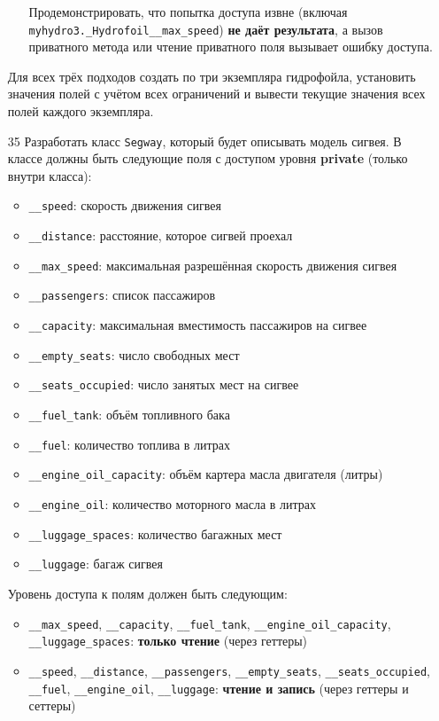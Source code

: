 \begin{enumerate}
\begin{enumerate}
    Продемонстрировать, что попытка доступа извне (включая \texttt{myhydro3.\_Hydrofoil\_\_max\_speed}) \textbf{не даёт результата}, а вызов приватного метода или чтение приватного поля вызывает ошибку доступа.
\end{enumerate}
Для всех трёх подходов создать по три экземпляра гидрофойла, установить значения полей с учётом всех ограничений и вывести текущие значения всех полей каждого экземпляра.
\item[35] Разработать класс \texttt{Segway}, который будет описывать модель сигвея. В классе должны быть следующие поля с доступом уровня \textbf{private} (только внутри класса):
\begin{itemize}
    \item \texttt{\_\_speed}: скорость движения сигвея  
    \item \texttt{\_\_distance}: расстояние, которое сигвей проехал  
    \item \texttt{\_\_max\_speed}: максимальная разрешённая скорость движения сигвея  
    \item \texttt{\_\_passengers}: список пассажиров  
    \item \texttt{\_\_capacity}: максимальная вместимость пассажиров на сигвее  
    \item \texttt{\_\_empty\_seats}: число свободных мест  
    \item \texttt{\_\_seats\_occupied}: число занятых мест на сигвее  
    \item \texttt{\_\_fuel\_tank}: объём топливного бака  
    \item \texttt{\_\_fuel}: количество топлива в литрах  
    \item \texttt{\_\_engine\_oil\_capacity}: объём картера масла двигателя (литры)  
    \item \texttt{\_\_engine\_oil}: количество моторного масла в литрах  
    \item \texttt{\_\_luggage\_spaces}: количество багажных мест  
    \item \texttt{\_\_luggage}: багаж сигвея  
\end{itemize}
Уровень доступа к полям должен быть следующим:
\begin{itemize}
    \item \texttt{\_\_max\_speed}, \texttt{\_\_capacity}, \texttt{\_\_fuel\_tank}, \texttt{\_\_engine\_oil\_capacity}, \texttt{\_\_luggage\_spaces}: \textbf{только чтение} (через геттеры)  
    \item \texttt{\_\_speed}, \texttt{\_\_distance}, \texttt{\_\_passengers}, \texttt{\_\_empty\_seats}, \texttt{\_\_seats\_occupied}, \texttt{\_\_fuel}, \texttt{\_\_engine\_oil}, \texttt{\_\_luggage}: \textbf{чтение и запись} (через геттеры и сеттеры)

\end{itemize}
\end{enumerate}
